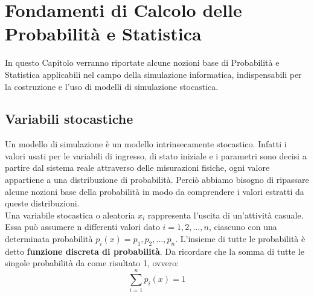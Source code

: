 \chapter{Fondamenti di Calcolo delle Probabilità e Statistica}
In questo Capitolo verranno riportate alcune nozioni base di Probabilità e Statistica applicabili nel campo della simulazione informatica, indispensabili per la costruzione e l’uso di
modelli di simulazione stocastica.

\section{Variabili stocastiche}
Un modello di simulazione è un modello intrinsecamente stocastico. Infatti i valori usati per le variabili di ingresso, di stato iniziale e i parametri sono decisi a partire dal sistema reale attraverso delle misurazioni fisiche, ogni valore appartiene a una distribuzione di probabilità. Perciò abbiamo bisogno di ripassare alcune nozioni base della probabilità in modo da comprendere i valori estratti da queste distribuzioni.\\

Una variabile stocastica o aleatoria $x_i$ rappresenta l'uscita di un'attività casuale. Essa può assumere n differenti valori dato $i ={1,2,...,n}$, ciascuno con una determinata probabilità $p_i(x) = p_1,p_2,...,p_n$.\label{fun_prob} L'insieme di tutte le probabilità è detto \textbf{funzione discreta di probabilità}. Da ricordare che la somma di tutte le singole probabilità da come risultato 1, ovvero:
\[ \sum_{i=1}^{n} p_i(x) = 1\]

